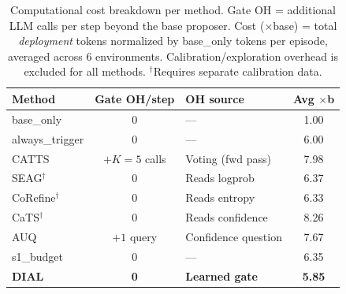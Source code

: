 \begin{table}[H]
\centering
\caption{Computational cost breakdown per method.
Gate OH = additional LLM calls per step beyond the base proposer.
Cost ($\times$base) = total \emph{deployment} tokens normalized by
base\_only tokens per episode, averaged across 6 environments.
Calibration/exploration overhead is excluded for all methods.
$^\dagger$Requires separate calibration data.}
\label{tab:cost-components}
\small
\begin{tabular}{lclc}
\toprule
\textbf{Method} & \textbf{Gate OH/step} & \textbf{OH source} & \textbf{Avg $\times$b} \\
\midrule
base\_only        & 0          & ---                    & 1.00 \\
always\_trigger   & 0          & ---                    & 6.00 \\
\midrule
CATTS             & $+K{=}5$ calls & Voting (fwd pass)  & 7.98 \\
SEAG$^\dagger$    & 0          & Reads logprob          & 6.37 \\
CoRefine$^\dagger$& 0          & Reads entropy          & 6.33 \\
CaTS$^\dagger$    & 0          & Reads confidence       & 8.26 \\
AUQ               & $+1$ query & Confidence question    & 7.67 \\
s1\_budget        & 0          & ---                    & 6.35 \\
\midrule
\textbf{DIAL}     & \textbf{0} & \textbf{Learned gate} & \textbf{5.85} \\
\bottomrule
\end{tabular}%
\end{table}
